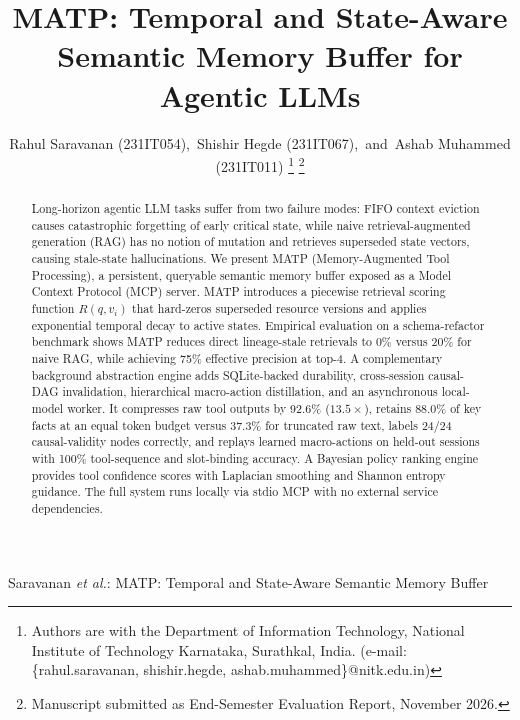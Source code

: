 \documentclass[lettersize,journal]{IEEEtran}
\begin{document}
\title{MATP: Temporal and State-Aware Semantic Memory Buffer for Agentic LLMs}

\author{Rahul Saravanan (231IT054),~Shishir Hegde (231IT067),~and~Ashab Muhammed (231IT011)%
\thanks{Authors are with the Department of Information Technology, National Institute of Technology Karnataka, Surathkal, India. (e-mail: \{rahul.saravanan, shishir.hegde, ashab.muhammed\}@nitk.edu.in)}%
\thanks{Manuscript submitted as End-Semester Evaluation Report, November 2026.}}

%
{Saravanan \MakeLowercase{\textit{et al.}}: MATP: Temporal and State-Aware Semantic Memory Buffer}

\maketitle

\begin{abstract}
Long-horizon agentic LLM tasks suffer from two failure modes: FIFO context eviction causes catastrophic forgetting of early critical state, while naive retrieval-augmented generation (RAG) has no notion of mutation and retrieves superseded state vectors, causing stale-state hallucinations. We present MATP (Memory-Augmented Tool Processing), a persistent, queryable semantic memory buffer exposed as a Model Context Protocol (MCP) server. MATP introduces a piecewise retrieval scoring function $R(q, v_i)$ that hard-zeros superseded resource versions and applies exponential temporal decay to active states. Empirical evaluation on a schema-refactor benchmark shows MATP reduces direct lineage-stale retrievals to 0\% versus 20\% for naive RAG, while achieving 75\% effective precision at top-4. A complementary background abstraction engine adds SQLite-backed durability, cross-session causal-DAG invalidation, hierarchical macro-action distillation, and an asynchronous local-model worker. It compresses raw tool outputs by 92.6\% ($13.5\times$), retains 88.0\% of key facts at an equal token budget versus 37.3\% for truncated raw text, labels 24/24 causal-validity nodes correctly, and replays learned macro-actions on held-out sessions with 100\% tool-sequence and slot-binding accuracy. A Bayesian policy ranking engine provides tool confidence scores with Laplacian smoothing and Shannon entropy guidance. The full system runs locally via stdio MCP with no external service dependencies.
\end{abstract}
\end{document}
